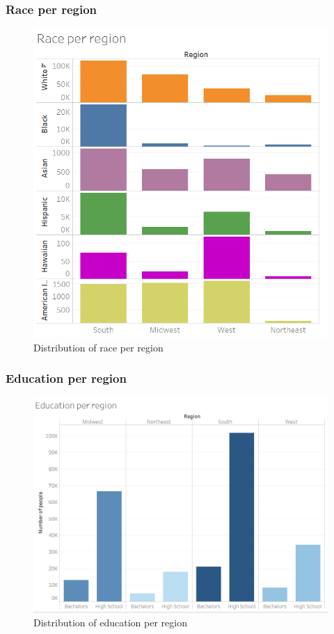 \documentclass[11pt]{article}
\begin{document}
\subsubsection{Race per region}
\begin{figure}[H]
    \centering
    \includegraphics[width=0.90\columnwidth]{assets/race_region.PNG}
    \caption{Distribution of race per region }
    \label{lr}
\end{figure}

\subsubsection{Education per region}
\begin{figure}[H]
    \centering
    \includegraphics[width=0.90\columnwidth]{assets/education_region.PNG}
    \caption{Distribution of education per region }
    \label{lr}
\end{figure}
\end{document}
